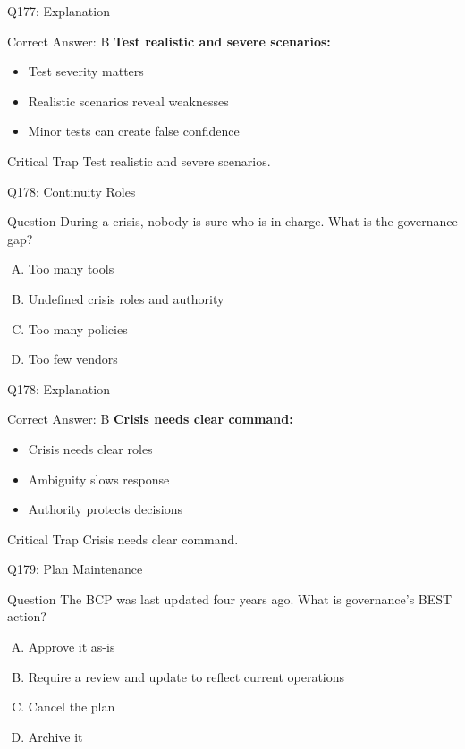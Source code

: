 \documentclass{beamer}
\begin{document}
	\begin{frame}{Q177: Explanation}
		\begin{block}{Correct Answer: B}
			\textbf{Test realistic and severe scenarios:}
			\begin{itemize}
				\item Test severity matters
				\item Realistic scenarios reveal weaknesses
				\item Minor tests can create false confidence
			\end{itemize}
		\end{block}
		\begin{alertblock}{Critical Trap}
			Test realistic and severe scenarios.
		\end{alertblock}
	\end{frame}
	
	\begin{frame}{Q178: Continuity Roles}
		\begin{block}{Question}
			During a crisis, nobody is sure who is in charge. What is the governance gap?
		\end{block}
		\begin{enumerate}[(A)]
			\item Too many tools
			\item Undefined crisis roles and authority
			\item Too many policies
			\item Too few vendors
		\end{enumerate}
	\end{frame}
	
	\begin{frame}{Q178: Explanation}
		\begin{block}{Correct Answer: B}
			\textbf{Crisis needs clear command:}
			\begin{itemize}
				\item Crisis needs clear roles
				\item Ambiguity slows response
				\item Authority protects decisions
			\end{itemize}
		\end{block}
		\begin{alertblock}{Critical Trap}
			Crisis needs clear command.
		\end{alertblock}
	\end{frame}
	
	\begin{frame}{Q179: Plan Maintenance}
		\begin{block}{Question}
			The BCP was last updated four years ago. What is governance's BEST action?
		\end{block}
		\begin{enumerate}[(A)]
			\item Approve it as-is
			\item Require a review and update to reflect current operations
			\item Cancel the plan
			\item Archive it
		\end{enumerate}
	\end{frame}
	
\end{document}
